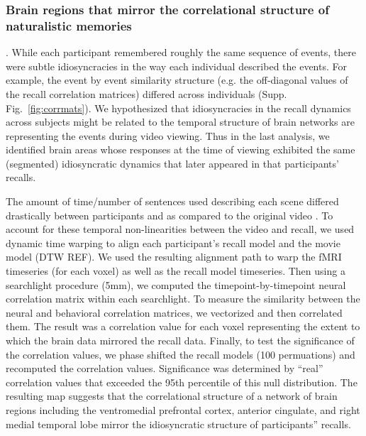 \documentclass{article}
\begin{document}
{\subsubsection{Brain regions that mirror the correlational structure of naturalistic memories}.
While each participant remembered roughly the same sequence of events, there were subtle idiosyncracies in the way each individual described the events. For example, the event by event similarity structure (e.g. the off-diagonal values of the recall correlation matrices) differed across individuals (Supp. Fig.~\ref{fig:corrmats}). We hypothesized that idiosyncracies in the recall dynamics across subjects might be related to the temporal structure of brain networks are representing the events during video viewing. Thus in the last analysis, we identified brain areas whose responses at the time of viewing exhibited the same (segmented) idiosyncratic dynamics that later appeared in that participants’ recalls.

The amount of time/number of sentences used describing each scene differed drastically between participants and as compared to the original video \cite{ChenEtal17}. To account for these temporal non-linearities between the video and recall, we used dynamic time warping to align each participant's recall model and the movie model (DTW REF).  We used the resulting alignment path to warp the fMRI timeseries (for each voxel) as well as the recall model timeseries.  Then using a searchlight procedure (5mm), we computed the timepoint-by-timepoint neural correlation matrix within each searchlight. To measure the similarity between the neural and behavioral correlation matrices, we vectorized and then correlated them. The result was a correlation value for each voxel representing the extent to which the brain data mirrored the recall data.  Finally, to test the significance of the correlation values, we phase shifted the recall models (100 permuations) and recomputed the correlation values. Significance was determined by ``real'' correlation values that exceeded the 95th percentile of this null distribution. The resulting map suggests that the correlational structure of a network of brain regions including the ventromedial prefrontal cortex, anterior cingulate, and right medial temporal lobe mirror the idiosyncratic structure of participants'' recalls.

}
\end{document}
